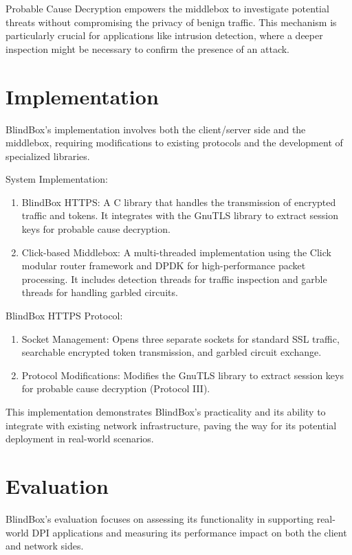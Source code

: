 \documentclass[conference]{IEEEtran}
\begin{document}
Probable Cause Decryption empowers the middlebox to investigate potential threats without compromising the privacy of benign traffic. This mechanism is particularly crucial for applications like intrusion detection, where a deeper inspection might be necessary to confirm the presence of an attack.
 
\section{Implementation}
 
BlindBox's implementation involves both the client/server side and the middlebox, requiring modifications to existing protocols and the development of specialized libraries.

System Implementation:

\begin{enumerate}
    \item BlindBox HTTPS: A C library that handles the transmission of encrypted traffic and tokens. It integrates with the GnuTLS library to extract session keys for probable cause decryption.
    \item Click-based Middlebox: A multi-threaded implementation using the Click modular router framework and DPDK for high-performance packet processing. It includes detection threads for traffic inspection and garble threads for handling garbled circuits.
\end{enumerate}

BlindBox HTTPS Protocol:

\begin{enumerate}
    \item Socket Management: Opens three separate sockets for standard SSL traffic, searchable encrypted token transmission, and garbled circuit exchange.
    \item Protocol Modifications: Modifies the GnuTLS library to extract session keys for probable cause decryption (Protocol III).
\end{enumerate}

This implementation demonstrates BlindBox's practicality and its ability to integrate with existing network infrastructure, paving the way for its potential deployment in real-world scenarios.

\section{Evaluation}

BlindBox's evaluation focuses on assessing its functionality in supporting real-world DPI applications and measuring its performance impact on both the client and network sides.
\end{document}
